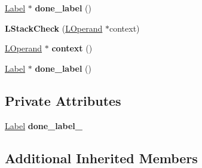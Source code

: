 \begin{DoxyCompactItemize}
\item 
\hyperlink{classv8_1_1internal_1_1_label}{Label} $\ast$ {\bfseries done\+\_\+label} ()\hypertarget{classv8_1_1internal_1_1_l_stack_check_a36de7b7b98baaea22f926a39366dcbf2}{}\label{classv8_1_1internal_1_1_l_stack_check_a36de7b7b98baaea22f926a39366dcbf2}

\item 
{\bfseries L\+Stack\+Check} (\hyperlink{classv8_1_1internal_1_1_l_operand}{L\+Operand} $\ast$context)\hypertarget{classv8_1_1internal_1_1_l_stack_check_a76c33e27a1750e54590d13d0f819d615}{}\label{classv8_1_1internal_1_1_l_stack_check_a76c33e27a1750e54590d13d0f819d615}

\item 
\hyperlink{classv8_1_1internal_1_1_l_operand}{L\+Operand} $\ast$ {\bfseries context} ()\hypertarget{classv8_1_1internal_1_1_l_stack_check_a40b44c26211342cf96a52a95d64b6bdb}{}\label{classv8_1_1internal_1_1_l_stack_check_a40b44c26211342cf96a52a95d64b6bdb}

\item 
\hyperlink{classv8_1_1internal_1_1_label}{Label} $\ast$ {\bfseries done\+\_\+label} ()\hypertarget{classv8_1_1internal_1_1_l_stack_check_a36de7b7b98baaea22f926a39366dcbf2}{}\label{classv8_1_1internal_1_1_l_stack_check_a36de7b7b98baaea22f926a39366dcbf2}

\end{DoxyCompactItemize}
\subsection*{Private Attributes}
\begin{DoxyCompactItemize}
\item 
\hyperlink{classv8_1_1internal_1_1_label}{Label} {\bfseries done\+\_\+label\+\_\+}\hypertarget{classv8_1_1internal_1_1_l_stack_check_a2a340910f83535376b8f1abf860b621c}{}\label{classv8_1_1internal_1_1_l_stack_check_a2a340910f83535376b8f1abf860b621c}

\end{DoxyCompactItemize}
\subsection*{Additional Inherited Members}


